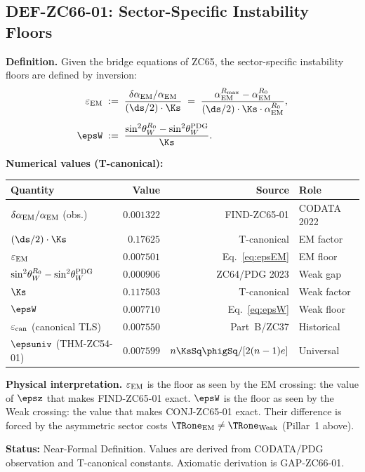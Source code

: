 \documentclass[12pt, a4paper]{article}
\renewcommand{\epsEM}{\varepsilon_{\rm EM}}
\renewcommand{\epscan}{\varepsilon_{\rm can}}
\renewcommand{\swsq}{\sin^2\!\theta_W}
\renewcommand{\aEM}{\alpha_{\rm EM}}
\begin{document}
\subsection{DEF-ZC66-01: Sector-Specific Instability Floors}
\label{sec:def01}


\begin{formalbox}[title={DEF-ZC66-01: Sector Floors $\epsEM$ and $\epsW$
  ($R_0/R_{\max}$, Near-Formal)}]
\textbf{Definition.}
Given the bridge equations of ZC65, the sector-specific
instability floors are defined by inversion:
\begin{align}
  \epsEM &\;:=\;
  \frac{\delta\aEM/\aEM}{(\ds/2)\cdot\Ks}
  \;=\;
  \frac{\aEM^{R_{\max}} - \aEM^{R_0}}{(\ds/2)\cdot\Ks\cdot\aEM^{R_0}},
  \label{eq:epsEM}\\[4pt]
  \epsW  &\;:=\;
  \frac{\swsq^{R_0} - \swsq^{\rm PDG}}{\Ks}.
  \label{eq:epsW}
\end{align}

\textbf{Numerical values (T-canonical):}
\begin{center}
\renewcommand{\arraystretch}{1.25}
\begin{tabular}{@{}lrrl@{}}
\toprule
Quantity & Value & Source & Role \\
\midrule
$\delta\aEM/\aEM$ (obs.) & $0.001322$ & FIND-ZC65-01 & CODATA 2022 \\
$(\ds/2)\cdot\Ks$        & $0.17625$  & T-canonical  & EM factor \\
$\epsEM$                  & $0.007501$ & Eq.~\eqref{eq:epsEM} & EM floor \\
\midrule
$\swsq^{R_0} - \swsq^{\rm PDG}$ & $0.000906$ & ZC64/PDG 2023 & Weak gap \\
$\Ks$                            & $0.117503$ & T-canonical   & Weak factor \\
$\epsW$                          & $0.007710$ & Eq.~\eqref{eq:epsW} & Weak floor \\
\midrule
$\epscan$ (canonical TLS)        & $0.007550$ & Part~B/ZC37 & Historical \\
$\epsuniv$ (THM-ZC54-01)         & $0.007599$ & $n\KsSq\phigSq/[2(n-1)e]$ & Universal \\
\bottomrule
\end{tabular}
\end{center}

\textbf{Physical interpretation.}
$\epsEM$ is the floor as seen by the EM crossing: the value
of $\epsz$ that makes FIND-ZC65-01 exact.
$\epsW$ is the floor as seen by the Weak crossing: the value
that makes CONJ-ZC65-01 exact.
Their difference is forced by the asymmetric sector costs
$\TRone_{\rm EM} \neq \TRone_{\rm Weak}$ (Pillar~1 above).

\textbf{Status:} Near-Formal Definition.
Values are derived from CODATA/PDG observation and T-canonical
constants. Axiomatic derivation is GAP-ZC66-01.
\end{formalbox}
\end{document}
